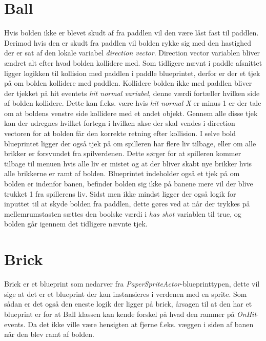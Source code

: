 \section{Ball}
Hvis bolden ikke er blevet skudt af fra paddlen vil den være låst fast til paddlen. Derimod hvis den er skudt fra paddlen vil bolden rykke sig med den hastighed der er sat af den lokale variabel \textit{direction vector}. Direction vector variablen bliver ændret alt efter hvad bolden kollidere med. Som tidligere nævnt i paddle afsnittet ligger logikken til kollision med paddlen i paddle blueprintet, derfor er der et tjek på om bolden kollidere med paddlen. Kollidere bolden ikke med paddlen bliver der tjekket på hit eventets \textit{hit normal variabel}, denne værdi fortæller hvilken side af bolden kollidere. Dette kan f.eks. være hvis \textit{hit normal X} er minus 1 er der tale om at boldens venstre side kollidere med et andet objekt. Gennem alle disse tjek kan der udregnes hvilket fortegn i hvilken akse der skal vendes i direction vectoren for at bolden får den korrekte retning efter kollision. I selve bold blueprintet ligger der også tjek på om spilleren har flere liv tilbage, eller om alle brikker er forsvundet fra spilverdenen. Dette sørger for at spilleren kommer tilbage til menuen hvis alle liv er mistet og at der bliver skabt nye brikker hvis alle brikkerne er ramt af bolden. Blueprintet indeholder også et tjek på om bolden er indenfor banen, befinder bolden sig ikke på banene mere vil der blive trukket 1 fra spillerens liv. Sidst men ikke mindst ligger der også logik for inputtet til at skyde bolden fra paddlen, dette gøres ved at når der trykkes på mellemrumstasten sættes den boolske værdi i \textit{has shot} variablen til true, og bolden går igennem det tidligere nævnte tjek.  

\section{Brick}
Brick er et blueprint som nedarver fra \textit{PaperSpriteActor}-blueprinttypen, dette vil sige at det er et blueprint der kan instansieres i verdenen med en sprite. Som sådan er det også den eneste logik der ligger på brick, årsagen til at den har et blueprint er for at Ball klassen kan kende forskel på hvad den rammer på \textit{OnHit}-events. Da det ikke ville være hensigten at fjerne f.eks. væggen i siden af banen når den blev ramt af bolden.

